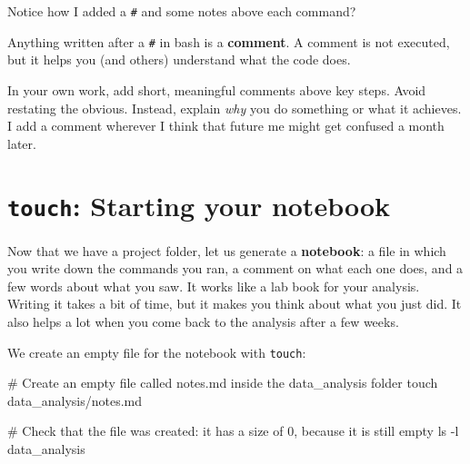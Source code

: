 \documentclass[
  letterpaper,
  DIV=11,
  numbers=noendperiod]{scrreprt}
\newenvironment{Shaded}{}{}
\newcommand{\AttributeTok}[1]{\textcolor[rgb]{0.84,0.23,0.29}{#1}}
\newcommand{\CommentTok}[1]{\textcolor[rgb]{0.42,0.45,0.49}{#1}}
\newcommand{\FunctionTok}[1]{\textcolor[rgb]{0.44,0.26,0.76}{#1}}
\newcommand{\NormalTok}[1]{\textcolor[rgb]{0.14,0.16,0.18}{#1}}
\begin{document}
\begin{tcolorbox}[enhanced jigsaw, coltitle=black, breakable, titlerule=0mm, colback=white, rightrule=.15mm, bottomrule=.15mm, toprule=.15mm, colframe=quarto-callout-tip-color-frame, colbacktitle=quarto-callout-tip-color!10!white, bottomtitle=1mm, opacitybacktitle=0.6, toptitle=1mm, leftrule=.75mm, arc=.35mm, title=\textcolor{quarto-callout-tip-color}{\faLightbulb}\hspace{0.5em}{Tip: Commenting your code}, left=2mm, opacityback=0]

Notice how I added a \texttt{\#} and some notes above each command?

Anything written after a \texttt{\#} in bash is a \textbf{comment}. A
comment is not executed, but it helps you (and others) understand what
the code does.

In your own work, add short, meaningful comments above key steps. Avoid
restating the obvious. Instead, explain \emph{why} you do something or
what it achieves. I add a comment wherever I think that future me might
get confused a month later.

\end{tcolorbox}

\section{\texorpdfstring{\texttt{touch}: Starting your
notebook}{touch: Starting your notebook}}\label{touch-starting-your-notebook}

Now that we have a project folder, let us generate a \textbf{notebook}:
a file in which you write down the commands you ran, a comment on what
each one does, and a few words about what you saw. It works like a lab
book for your analysis. Writing it takes a bit of time, but it makes you
think about what you just did. It also helps a lot when you come back to
the analysis after a few weeks.

We create an empty file for the notebook with \texttt{touch}:

\begin{Shaded}
\begin{Highlighting}[]
\CommentTok{\# Create an empty file called notes.md inside the data\_analysis folder}
\FunctionTok{touch}\NormalTok{ data\_analysis/notes.md}

\CommentTok{\# Check that the file was created: it has a size of 0, because it is still empty}
\FunctionTok{ls} \AttributeTok{{-}l}\NormalTok{ data\_analysis}
\end{Highlighting}
\end{Shaded}
\end{document}
